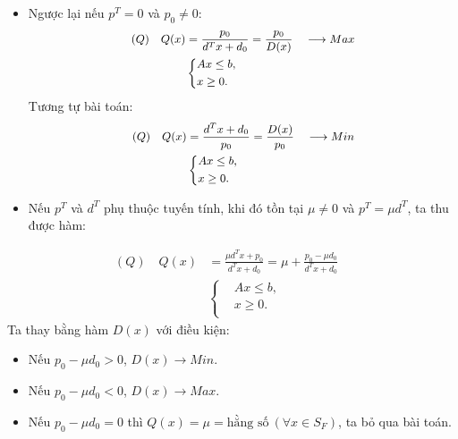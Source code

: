\documentclass{beamer}
\begin{document}
\begin{frame}
\begin{itemize}
\item Ngược lại nếu $p^T=0$ và $p_0 \neq 0$:
\begin{equation} \small \label{Q}
    \begin{split}
    (Q) \quad Q(x) & = \frac{p_0}{d^Tx+d_0} = \frac{p_0}{D(x)} \quad \longrightarrow Max \\
        & \left\{
        \begin{split}
        &Ax \leq  b, \\
        &x \geq 0. \\
        \end{split}
        \right.    
    \end{split}
\end{equation}
Tương tự bài toán:
\begin{equation} \small \label{Q}
    \begin{split}
    (Q) \quad Q(x) & = \frac{d^Tx+d_0}{p_0} = \frac{D(x)}{p_0} \quad \longrightarrow Min \\
        & \left\{
        \begin{split}
        &Ax \leq  b, \\
        &x \geq 0. \\
        \end{split}
        \right.    
    \end{split}
\end{equation}
\item Nếu $p^T$ và $d^T$ phụ thuộc tuyến tính, khi đó tồn tại $\mu \neq 0$ và $p^T=\mu d^T$, ta thu được hàm:
\end{itemize}
\end{frame}
\begin{frame}
\begin{equation} \label{Q}
    \begin{split}
    (Q) \quad Q(x) & = \frac{\mu d^Tx + p_0}{d^Tx+d_0} = \mu + \frac{p_0-\mu d_0}{d^Tx+d_0} \quad \\
        & \left\{
        \begin{split}
        &Ax \leq  b, \\
        &x \geq 0. \\
        \end{split}
        \right.    
    \end{split}
\end{equation}
Ta thay bằng hàm $D(x)$ với điều kiện:
\begin{itemize}
\item Nếu $p_0 - \mu d_0 > 0$, $D(x) \longrightarrow Min$.
\item Nếu $p_0 - \mu d_0 < 0$, $D(x) \longrightarrow Max$.
\item Nếu $p_0 - \mu d_0 = 0$ thì $Q(x)=\mu= \text{hằng số} \: (\forall x \in S_F)$, ta bỏ qua bài toán.
\end{itemize}
\end{frame}
\end{document}
